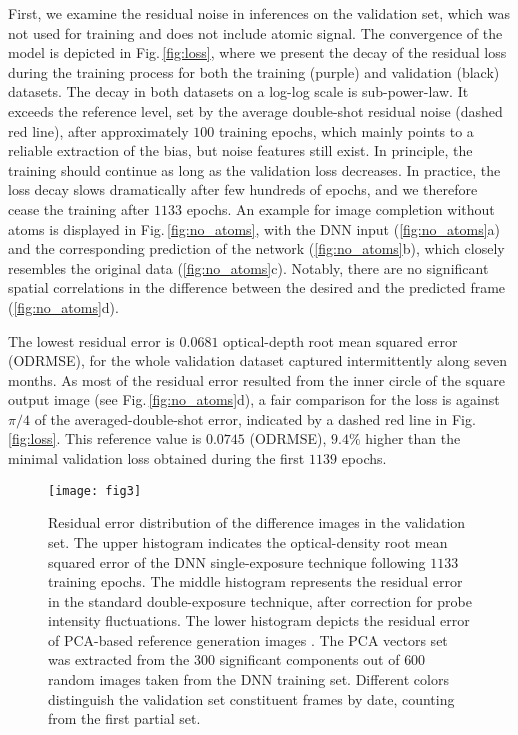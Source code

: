 \documentclass[twocolumn,groupedaddress,longbibliography]{revtex4-1}
\begin{document}
First, we examine the residual noise in inferences on the validation set, which was not used for training and does not include atomic signal. The convergence of the model is depicted in Fig.\,\ref{fig:loss}, where we present the decay of the residual loss during the training process for both the training (purple) and validation (black) datasets. The decay in both datasets on a log-log scale is sub-power-law. It exceeds the reference level, set by the average double-shot residual noise (dashed red line), after approximately $100$ training epochs, which mainly points to a reliable extraction of the bias, but noise features still exist.
In principle, the training should continue as long as the validation loss decreases. In practice, the loss decay slows dramatically after few hundreds of epochs, and we therefore cease the training after $1133$ epochs. An example for image completion without atoms is displayed in Fig.\,\ref{fig:no_atoms}, with the DNN input (\ref{fig:no_atoms}a) and the corresponding prediction of the network (\ref{fig:no_atoms}b), which closely resembles the original data (\ref{fig:no_atoms}c). Notably, there are no significant spatial correlations in the difference between the desired and the predicted frame (\ref{fig:no_atoms}d).

The lowest residual error is $0.0681$ optical-depth root mean squared error (ODRMSE), for the whole validation dataset captured intermittently along seven months. As most of the residual error resulted from the inner circle of the square output image (see Fig.\,\ref{fig:no_atoms}d), a fair comparison for the loss is against $\pi/4$ of the averaged-double-shot error, indicated by a dashed red line in Fig.\,\ref{fig:loss}. This reference value is $0.0745$ (ODRMSE), $9.4\%$ higher than the minimal validation loss obtained during the first $1139$ epochs.

\begin{figure}
\centering
\texttt{[image: fig3]}
\caption{Residual error distribution of the difference images in the validation set. The upper histogram indicates the optical-density root mean squared error of the DNN single-exposure technique following $1133$ training epochs. The middle histogram represents the residual error in the standard double-exposure technique, after correction for probe intensity fluctuations. The lower histogram depicts the residual error of PCA-based reference generation images \cite{Niu2018}. The PCA vectors set was extracted from the $300$ significant components out of $600$ random images taken from the DNN training set. Different colors distinguish the validation set constituent frames by date, counting from the first partial set.
}
\label{fig:loss_hist}
\end{figure}
\end{document}
